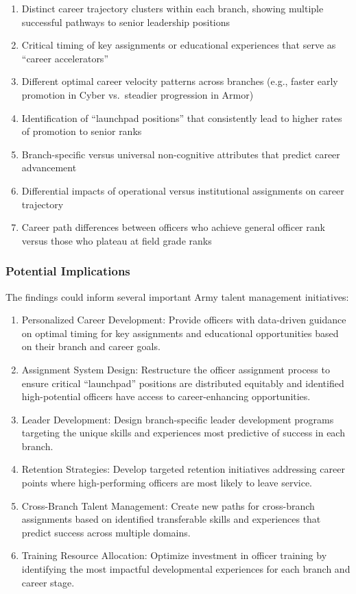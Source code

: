 \documentclass[
  letterpaper,
  DIV=11,
  numbers=noendperiod]{scrartcl}
\providecommand{\tightlist}{%
  \setlength{\itemsep}{0pt}\setlength{\parskip}{0pt}}
\begin{document}
\begin{enumerate}
\def\labelenumi{\arabic{enumi}.}
\tightlist
\item
  Distinct career trajectory clusters within each branch, showing
  multiple successful pathways to senior leadership positions
\item
  Critical timing of key assignments or educational experiences that
  serve as ``career accelerators''
\item
  Different optimal career velocity patterns across branches (e.g.,
  faster early promotion in Cyber vs.~steadier progression in Armor)
\item
  Identification of ``launchpad positions'' that consistently lead to
  higher rates of promotion to senior ranks
\item
  Branch-specific versus universal non-cognitive attributes that predict
  career advancement
\item
  Differential impacts of operational versus institutional assignments
  on career trajectory
\item
  Career path differences between officers who achieve general officer
  rank versus those who plateau at field grade ranks
\end{enumerate}

\subsubsection{Potential Implications}\label{potential-implications}

The findings could inform several important Army talent management
initiatives:

\begin{enumerate}
\def\labelenumi{\arabic{enumi}.}
\item
  Personalized Career Development: Provide officers with data-driven
  guidance on optimal timing for key assignments and educational
  opportunities based on their branch and career goals.
\item
  Assignment System Design: Restructure the officer assignment process
  to ensure critical ``launchpad'' positions are distributed equitably
  and identified high-potential officers have access to career-enhancing
  opportunities.
\item
  Leader Development: Design branch-specific leader development programs
  targeting the unique skills and experiences most predictive of success
  in each branch.
\item
  Retention Strategies: Develop targeted retention initiatives
  addressing career points where high-performing officers are most
  likely to leave service.
\item
  Cross-Branch Talent Management: Create new paths for cross-branch
  assignments based on identified transferable skills and experiences
  that predict success across multiple domains.
\item
  Training Resource Allocation: Optimize investment in officer training
  by identifying the most impactful developmental experiences for each
  branch and career stage.
\end{enumerate}
\end{document}
